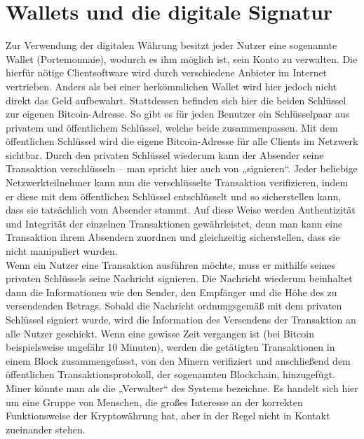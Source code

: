 \documentclass[12pt]{article}
\begin{document}
\section{Wallets und die digitale Signatur}
Zur Verwendung der digitalen Währung besitzt jeder Nutzer eine sogenannte Wallet (Portemonnaie), wodurch es ihm möglich ist, sein Konto zu verwalten. Die hierfür nötige Clientsoftware wird durch verschiedene Anbieter im Internet vertrieben. Anders als bei einer herkömmlichen Wallet wird hier jedoch nicht direkt das Geld aufbewahrt. Stattdessen befinden sich hier die beiden Schlüssel zur eigenen Bitcoin-Adresse. So gibt es für jeden Benutzer ein Schlüsselpaar aus privatem und öffentlichem Schlüssel, welche beide zusammenpassen. Mit dem öffentlichen Schlüssel wird die eigene Bitcoin-Adresse für alle Clients im Netzwerk sichtbar. Durch den privaten Schlüssel wiederum kann der Absender seine Transaktion verschlüsseln – man spricht hier auch von „signieren“. Jeder beliebige Netzwerkteilnehmer kann nun die verschlüsselte Transaktion verifizieren, indem er diese mit dem öffentlichen Schlüssel entschlüsselt und so sicherstellen kann, dass sie tatsächlich vom Absender stammt. Auf diese Weise werden Authentizität und Integrität der einzelnen Transaktionen gewährleistet, denn man kann eine Transaktion ihrem Absendern zuordnen und gleichzeitig sicherstellen, dass sie nicht manipuliert wurden.\\
Wenn ein Nutzer eine Transaktion ausführen möchte, muss er mithilfe seines privaten Schlüssels seine Nachricht signieren. Die Nachricht wiederum beinhaltet dann die Informationen wie den Sender, den Empfänger und die Höhe des zu versendenden Betrags. Sobald die Nachricht ordnungsgemäß mit dem privaten Schlüssel signiert wurde, wird die Information des Versendens der Transaktion an alle Nutzer geschickt. Wenn eine gewisse Zeit vergangen ist (bei Bitcoin beispielsweise ungefähr 10 Minuten), werden die getätigten Transaktionen in einem Block zusammengefasst, von den Minern verifiziert und anschließend dem öffentlichen Transaktionsprotokoll, der sogenannten Blockchain, hinzugefügt. Miner könnte man als die „Verwalter“ des Systems bezeichne. Es handelt sich hier um eine Gruppe von Menschen, die großes Interesse an der korrekten Funktionsweise der Kryptowährung hat, aber in der Regel nicht in Kontakt zueinander stehen.
\end{document}
